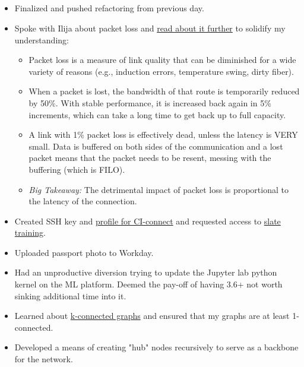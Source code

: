\documentclass{weeklyreport}
\begin{document}
\subsection*{}

\begin{itemize}
    \item Finalized and pushed refactoring from previous day.
    \item Spoke with Ilija about packet loss and \href{https://en.wikipedia.org/wiki/Packet_loss}{read about it further} to solidify my understanding:
    \begin{itemize}
    	\item Packet loss is a measure of link quality that can be diminished for a wide variety of reasons (e.g., induction errors, temperature swing, dirty fiber).
    	\item When a packet is lost, the bandwidth of that route is temporarily reduced by 50\%. With stable performance, it is increased back again in 5\% increments, which can take a long time to get back up to full capacity.
    	\item A link with 1\% packet loss is effectively dead, unless the latency is VERY small. Data is buffered on both sides of the communication and a lost packet means that the packet needs to be resent, messing with the buffering (which is FILO).
    	\item \textit{Big Takeaway:} The detrimental impact of packet loss is proportional to the latency of the connection.
    \end{itemize}
    \item Created SSH key and \href{https://www.ci-connect.net/profile}{profile for CI-connect} and requested access to \href{https://www.ci-connect.net/groups/root.slate-training}{slate training}.
    \item Uploaded passport photo to Workday.
    \item Had an unproductive diversion trying to update the Jupyter lab python kernel on the ML platform. Deemed the pay-off of having 3.6+ not worth sinking additional time into it.
    \item Learned about \href{https://www.youtube.com/watch?v=5wCZqdCDafc}{k-connected graphs} and ensured that my graphs are at least 1-connected.
    \item Developed a means of creating "hub" nodes recursively to serve as a backbone for the network.
\end{itemize}

\subsection*{}
\end{document}
